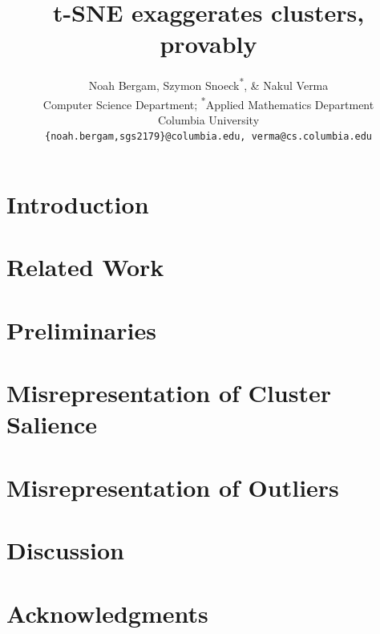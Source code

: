 \documentclass{article} %
\title{t-SNE exaggerates clusters, provably}
\author{Noah Bergam\textsuperscript{\textdagger}, Szymon Snoeck\textsuperscript{*}, \& Nakul Verma\textsuperscript{\textdagger} \\
\textsuperscript{\textdagger}Computer Science Department; \textsuperscript{*}Applied Mathematics Department\\
Columbia University \\
\texttt{\{noah.bergam,sgs2179\}@columbia.edu, verma@cs.columbia.edu} \\
}
\begin{document}
\maketitle

\begin{abstract}

\end{abstract}

\section{Introduction}


\section{Related Work}


\section{Preliminaries}\label{sec:preliminaries}


\section{Misrepresentation of Cluster Salience}\label{sec:mis_clusters}

%


\section{Misrepresentation of Outliers}


\section{Discussion}


\section*{Acknowledgments}








\newpage
\appendix

\end{document}
